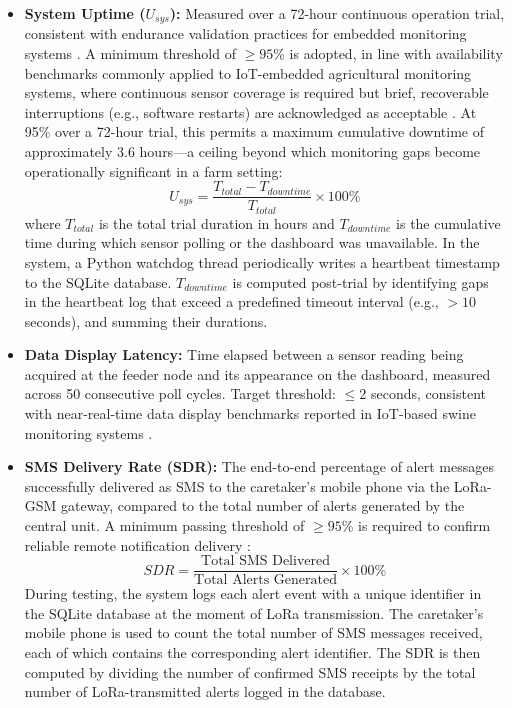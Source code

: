 \begin{itemize}
  \item \textbf{System Uptime ($U_{sys}$):} Measured over a 72-hour continuous operation trial, consistent with endurance validation practices for embedded monitoring systems \cite{beyondtech2025smart,adeoye2025animalia}. A minimum threshold of $\geq 95\%$ is adopted, in line with availability benchmarks commonly applied to IoT-embedded agricultural monitoring systems, where continuous sensor coverage is required but brief, recoverable interruptions (e.g., software restarts) are acknowledged as acceptable \cite{tibreza2023swine,carvalho2023iot,beyondtech2025smart}. At 95\% over a 72-hour trial, this permits a maximum cumulative downtime of approximately 3.6 hours---a ceiling beyond which monitoring gaps become operationally significant in a farm setting:
    \begin{equation}
      U_{sys} = \frac{T_{total} - T_{downtime}}{T_{total}} \times 100\%
    \end{equation}
    where $T_{total}$ is the total trial duration in hours and $T_{downtime}$ is the cumulative time during which sensor polling or the dashboard was unavailable. In the system, a Python watchdog thread periodically writes a heartbeat timestamp to the SQLite database. $T_{downtime}$ is computed post-trial by identifying gaps in the heartbeat log that exceed a predefined timeout interval (e.g., $> 10$ seconds), and summing their durations.
  \item \textbf{Data Display Latency:} Time elapsed between a sensor reading being acquired at the feeder node and its appearance on the dashboard, measured across 50 consecutive poll cycles. Target threshold: $\le 2$ seconds, consistent with near-real-time data display benchmarks reported in IoT-based swine monitoring systems \cite{he2024iot,beyondtech2025smart}.
  \item \textbf{SMS Delivery Rate (SDR):} The end-to-end percentage of alert messages successfully delivered as SMS to the caretaker's mobile phone via the LoRa-GSM gateway, compared to the total number of alerts generated by the central unit. A minimum passing threshold of $\geq 95\%$ is required to confirm reliable remote notification delivery \cite{beyondtech2025smart,reza2025review}:
    \begin{equation}
      SDR = \frac{\text{Total SMS Delivered}}{\text{Total Alerts Generated}} \times 100\%
    \end{equation}
    During testing, the system logs each alert event with a unique identifier in the SQLite database at the moment of LoRa transmission. The caretaker's mobile phone is used to count the total number of SMS messages received, each of which contains the corresponding alert identifier. The SDR is then computed by dividing the number of confirmed SMS receipts by the total number of LoRa-transmitted alerts logged in the database.

\end{itemize}
